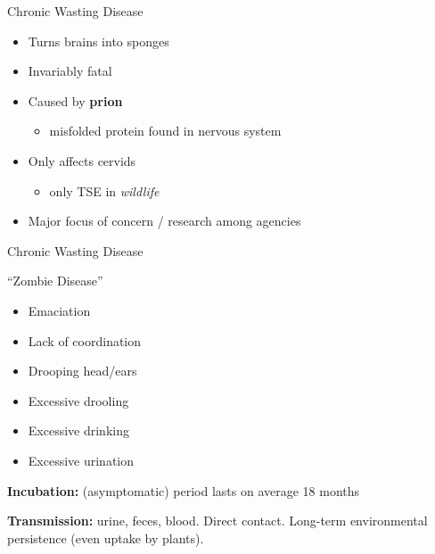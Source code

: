 \documentclass[
  11pt,
  ignorenonframetext,
  aspectratio=43]{beamer}
\providecommand{\tightlist}{%
  \setlength{\itemsep}{0pt}\setlength{\parskip}{0pt}}
\begin{document}
\begin{frame}{Chronic Wasting Disease}
\protect\hypertarget{chronic-wasting-disease}{}
\bcol

\col[.6]

\small


\begin{itemize}
\tightlist
\item
  Turns brains into sponges
\item
  Invariably fatal
\item
  Caused by \textbf{prion}

  \begin{itemize}
  \tightlist
  \item
    misfolded protein found in nervous system
  \end{itemize}
\item
  Only affects cervids

  \begin{itemize}
  \tightlist
  \item
    only TSE in \emph{wildlife}
  \end{itemize}
\item
  Major focus of concern / research among agencies
\end{itemize}

\ebb

\col[.4]


\ecol
\end{frame}

\begin{frame}{Chronic Wasting Disease}
\protect\hypertarget{chronic-wasting-disease-1}{}
\bcol

\col[.5]

\small


``Zombie Disease''

\begin{itemize}
\tightlist
\item
  Emaciation
\item
  Lack of coordination
\item
  Drooping head/ears
\item
  Excessive drooling
\item
  Excessive drinking
\item
  Excessive urination
\end{itemize}

\ebb

\col[.5]

\ecol

\textbf{Incubation:} (asymptomatic) period lasts on average 18 months

\textbf{Transmission:} urine, feces, blood. Direct contact. Long-term
environmental persistence (even uptake by plants).
\end{frame}
\end{document}
